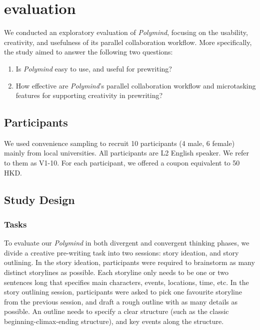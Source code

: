 \section{evaluation}
We conducted an exploratory evaluation of \textit{Polymind}, focusing on the usability, creativity, and usefulness of its parallel collaboration workflow.
More specifically, the study aimed to answer the following two questions:
\begin{enumerate}
    \item Is \textit{Polymind} easy to use, and useful for prewriting?
    \item How effective are \textit{Polymind}'s parallel collaboration workflow and microtasking features for supporting creativity in prewriting?
\end{enumerate}

% 

\subsection{Participants}
We used convenience sampling to recruit 10 participants (4 male, 6 female) mainly from local universities. All participants are L2 English speaker.
We refer to them as V1-10. For each participant, we offered a coupon equivalent to 50 HKD.

\subsection{Study Design}

\subsubsection{Tasks}
To evaluate our \textit{Polymind} in both divergent and convergent thinking phases, we divide a creative pre-writing task into two sessions: story ideation, and story outlining. In the story ideation, participants were required to brainstorm as many distinct storylines as possible. Each storyline only needs to be one or two sentences long that specifies main characters, events, locations, time, etc. In the story outlining session, participants were asked to pick one favourite storyline from the previous session, and draft a rough outline with as many details as possible. An outline needs to specify a clear structure (such as the classic beginning-climax-ending structure), and key events along the structure.

